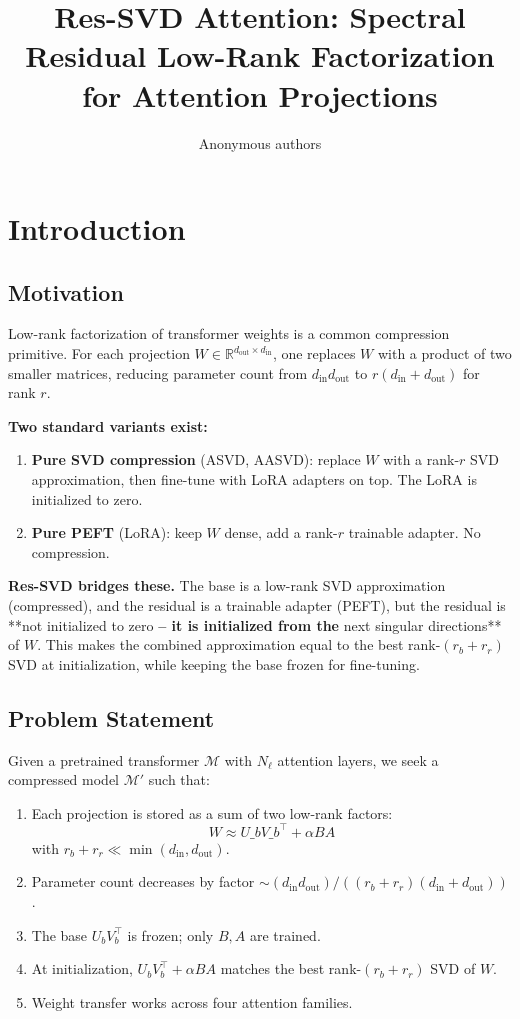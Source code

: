 \title{\textbf{Res-SVD Attention: Spectral Residual Low-Rank Factorization for Attention Projections}}

\author{Anonymous authors}


\section{Introduction}

\subsection{Motivation}

Low-rank factorization of transformer weights is a common compression 
primitive. For each projection $W \in \mathbb{R}^{d_\text{out} \times d_\text{in}}$, 
one replaces $W$ with a product of two smaller matrices, reducing parameter 
count from $d_\text{in} d_\text{out}$ to $r(d_\text{in} + d_\text{out})$ 
for rank $r$.

\textbf{Two standard variants exist:}

\begin{enumerate}
\item \textbf{Pure SVD compression} (ASVD, AASVD): replace $W$ with a rank-$r$ SVD
  approximation, then fine-tune with LoRA adapters on top. The LoRA is
  initialized to zero.
\item \textbf{Pure PEFT} (LoRA): keep $W$ dense, add a rank-$r$ trainable adapter.
  No compression.

\end{enumerate}
\textbf{Res-SVD bridges these.} The base is a low-rank SVD approximation (compressed), 
and the residual is a trainable adapter (PEFT), but the residual is **not 
initialized to zero\textbf{ -- it is initialized from the }next singular directions** 
of $W$. This makes the combined approximation equal to the best rank-$(r_b + r_r)$ 
SVD at initialization, while keeping the base frozen for fine-tuning.

\subsection{Problem Statement}

Given a pretrained transformer $\mathcal{M}$ with $N_\ell$ attention layers, 
we seek a compressed model $\mathcal{M}'$ such that:

\begin{enumerate}
\item Each projection is stored as a sum of two low-rank factors:
  $$
  W \approx U\_b V\_b^\top + \alpha B A
  \tag{1.1}
  $$
  with $r_b + r_r \ll \min(d_\text{in}, d_\text{out})$.
\item Parameter count decreases by factor $\sim (d_\text{in} d_\text{out}) / ((r_b + r_r)(d_\text{in} + d_\text{out}))$.
\item The base $U_b V_b^\top$ is frozen; only $B, A$ are trained.
\item At initialization, $U_b V_b^\top + \alpha B A$ matches the best rank-$(r_b + r_r)$
  SVD of $W$.
\item Weight transfer works across four attention families.

\end{enumerate}
